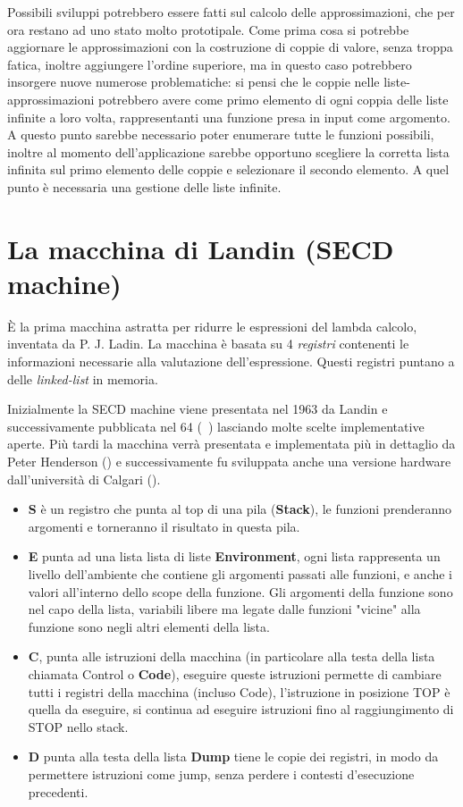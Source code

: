 \documentclass{article}
\begin{document}
Possibili sviluppi potrebbero essere fatti sul calcolo delle approssimazioni, che per ora restano ad uno stato molto prototipale. Come prima cosa si potrebbe aggiornare le approssimazioni con la costruzione di coppie di valore, senza troppa fatica, inoltre aggiungere l'ordine superiore, ma in questo caso potrebbero insorgere nuove numerose problematiche: si pensi che le coppie nelle liste-approssimazioni potrebbero avere come primo elemento di ogni coppia delle liste infinite a loro volta, rappresentanti una funzione presa in input come argomento. A questo punto sarebbe necessario poter enumerare tutte le funzioni possibili, inoltre al momento dell'applicazione sarebbe opportuno scegliere la corretta lista infinita sul primo elemento delle coppie e selezionare il secondo elemento. A quel punto è necessaria una gestione delle liste infinite.


\appendix

\section{La macchina di Landin (SECD machine)}
\label{sec:landin}
È la prima macchina astratta per ridurre le espressioni del lambda calcolo, inventata da P. J. Ladin. La macchina è basata su 4 \emph{registri} contenenti le informazioni necessarie alla valutazione dell'espressione. Questi registri puntano a delle \emph{linked-list} in memoria.

Inizialmente la SECD machine viene presentata nel 1963 da Landin e successivamente pubblicata nel 64 (~\cite{LandinPJ}) lasciando molte scelte implementative aperte. Più tardi la macchina verrà presentata e implementata più in dettaglio da Peter Henderson (\cite{Henderson}) e successivamente fu sviluppata anche una versione hardware dall'università di Calgari (\cite{DesIsu}).

\begin{itemize}
	\item \textbf{S} è un registro che punta al top di una pila (\textbf{Stack}), le funzioni prenderanno argomenti e torneranno il risultato in questa pila.
	\item \textbf{E} punta ad una lista lista di liste \textbf{Environment}, ogni lista rappresenta un livello dell'ambiente che contiene gli argomenti passati alle funzioni, e anche i valori all'interno dello scope della funzione.
	Gli argomenti della funzione sono nel capo della lista, variabili libere ma legate dalle funzioni "vicine" alla funzione sono negli altri elementi della lista.
	\item \textbf{C}, punta alle istruzioni della macchina (in particolare alla testa della lista chiamata Control o \textbf{Code}), eseguire queste istruzioni permette di cambiare tutti i registri della macchina (incluso Code), l'istruzione in posizione TOP è quella da eseguire, si continua ad eseguire istruzioni fino al raggiungimento di STOP nello stack.
	\item \textbf{D} punta alla testa della lista \textbf{Dump} tiene le copie dei registri, in modo da permettere istruzioni come jump, senza perdere i contesti d'esecuzione precedenti.
\end{itemize}
\end{document}
